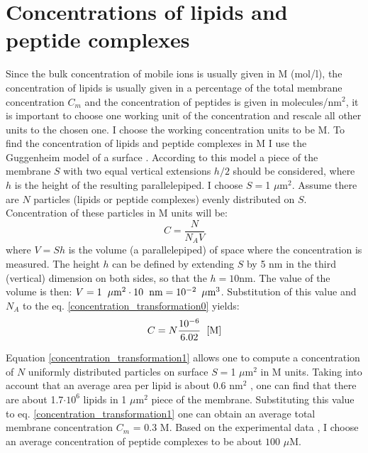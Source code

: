 \chapter{Concentrations of lipids and peptide complexes}

\label{appendix_concentration}

Since the bulk concentration of mobile ions is usually given in M (mol/l), the concentration of lipids is usually given in a percentage of the total membrane concentration $C_m$ and the concentration of peptides is given in molecules/nm$^2$, it is important to choose one working unit of the concentration and rescale all other units to the chosen one. I choose the working concentration units to be M. To find the concentration of lipids and peptide complexes in M I use the Guggenheim model of a surface \cite{McLaughlin1995}. According to this model a piece of the membrane $S$ with two equal vertical extensions $h/2$ should be considered, where $h$ is the height of the resulting parallelepiped. I choose $S=$1 $\mu$m$^2$. Assume there are $N$ particles (lipids or peptide complexes) evenly distributed on $S$. Concentration of these particles in M units will be:
\begin{equation}
 \label{concentration_transformation0}C = \frac{N}{N_AV}
\end{equation}
where $V=Sh$ is the volume (a parallelepiped) of space where the concentration is measured. The height $h$ can be defined by extending $S$ by 5 nm in the third (vertical) dimension on both sides, so that the $h=10$nm. The value of the volume is then: $V = 1\hspace{0.08in} \mu \text{m}^2 \cdot 10\hspace{0.08in} \text{nm} = 10^{-2}\hspace{0.07in} \mu \text{m}^3$. Substitution of this value and $N_A$ to the eq. \eqref{concentration_transformation0} yields:
\begin{equation}
 \label{concentration_transformation1}C = N\frac{10^{-6}}{6.02}\hspace{0.08in} [\text{M}]
\end{equation}

Equation \eqref{concentration_transformation1} allows one to compute a concentration of $N$ uniformly distributed particles on surface $S=$1 $\mu$m$^2$ in M units. Taking into account that an average area per lipid is about 0.6 nm$^2$ \cite{Petrache2000}, one can find that there are about 1.7$\cdot10^6$ lipids in 1 $\mu$m$^2$ piece of the membrane. Substituting this value to eq. \eqref{concentration_transformation1} one can obtain an average total membrane concentration $C_m$ = 0.3 M. Based on the experimental data \cite{Prior2003,Hancock2005}, I choose an average concentration of peptide complexes to be about $100$ $\mu$M.